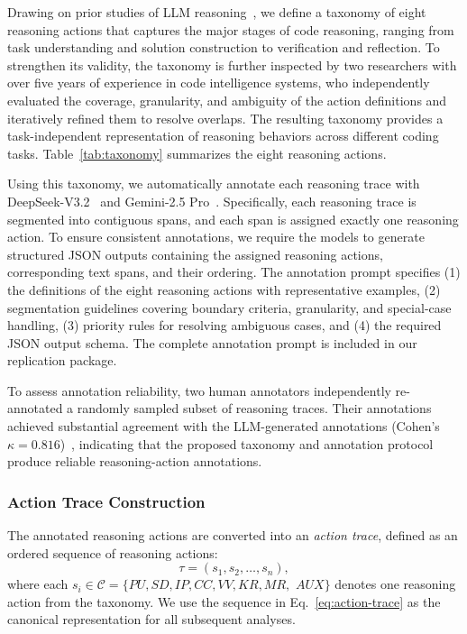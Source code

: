 \documentclass[acmsmall,screen,review,anonymous]{acmart}
\begin{document}
Drawing on prior studies of LLM reasoning~\cite{codethinksurvey,thinkingpatterns,reflexion,selfrefine}, we define a taxonomy of eight reasoning actions that captures the major stages of code reasoning, ranging from task understanding and solution construction to verification and reflection. To strengthen its validity, the taxonomy is further inspected by two researchers with over five years of experience in code intelligence systems, who independently evaluated the coverage, granularity, and ambiguity of the action definitions and iteratively refined them to resolve overlaps. The resulting taxonomy provides a task-independent representation of reasoning behaviors across different coding tasks. Table~\ref{tab:taxonomy} summarizes the eight reasoning actions.



Using this taxonomy, we automatically annotate each reasoning trace with DeepSeek-V3.2~\cite{deepseekv32} and Gemini-2.5 Pro~\cite{gemini25}. Specifically, each reasoning trace is segmented into contiguous spans, and each span is assigned exactly one reasoning action. To ensure consistent annotations, we require the models to generate structured JSON outputs containing the assigned reasoning actions, corresponding text spans, and their ordering. The annotation prompt specifies (1) the definitions of the eight reasoning actions with representative examples, (2) segmentation guidelines covering boundary criteria, granularity, and special-case handling, (3) priority rules for resolving ambiguous cases, and (4) the required JSON output schema. The complete annotation prompt is included in our replication package.

To assess annotation reliability, two human annotators independently re-annotated a randomly sampled subset of reasoning traces. Their annotations achieved substantial agreement with the LLM-generated annotations (Cohen's $\kappa=0.816$)~\cite{cohen1960kappa}, indicating that the proposed taxonomy and annotation protocol produce reliable reasoning-action annotations.

\subsubsection{\textbf{Action Trace Construction}}
The annotated reasoning actions are converted into an \textit{action trace}, defined as an ordered sequence of reasoning actions:
\begin{equation}
\tau=(s_1,s_2,\ldots,s_n),
\label{eq:action-trace}
\end{equation}
where each $s_i \in \mathcal{C}=\{PU,SD,IP,CC,VV,KR,MR,$ $AUX\}$ denotes one reasoning action from the taxonomy. We use the sequence in Eq.~\eqref{eq:action-trace} as the canonical representation for all subsequent analyses.
\end{document}
